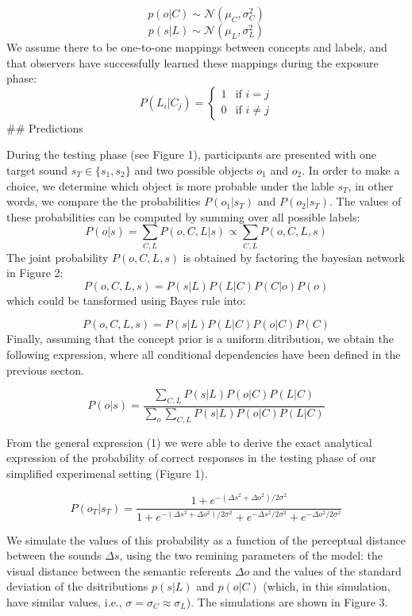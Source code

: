 \documentclass[10pt, letterpaper]{article}
\begin{document}
\[ p(o | C) \sim  \mathcal{N}(\mu_C, \sigma^2_C) \]
\[ p(s| L) \sim  \mathcal{N}(\mu_L, \sigma^2_L) \] We assume there to be
one-to-one mappings between concepts and labels, and that observers have
successfully learned these mappings during the exposure phase: \[
P(L_i|C_j) = 
\begin{cases}
  1 & \text{if  }  i=j \\  
  0  & \text{if  }  i\neq j 
\end{cases}
\] \#\# Predictions

During the testing phase (see Figure 1), participants are presented with
one target sound \(s_T \in\{s_1, s_2\}\) and two possible objects
\(o_1\) and \(o_2\). In order to make a choice, we determine which
object is more probable under the lable \(s_T\), in other words, we
compare the the probabilities \(P(o_1|s_T)\) and \(P(o_2|s_T)\). The
values of these probabilities can be computed by summing over all
possible labels:
\[P(o|s)=\sum_{C,L} P(o, C, L| s) \propto \sum_{C,L} P(o, C, L, s) \]
The joint probability \(P(o, C, L, s)\) is obtained by factoring the
bayesian network in Figure 2: \[P(o,C,L,s) = P(s|L)P(L|C)P(C|o)P(o) \]
which could be tansformed using Bayes rule into:

\[P(o,C,L,s) = P(s|L)P(L|C)P(o|C)P(C) \] Finally, assuming that the
concept prior is a uniform ditribution, we obtain the following
expression, where all conditional dependencies have been defined in the
previous secton.

\begin{equation}
P(o|s) = \frac{\sum_{C,L} P(s|L)P(o|C)P(L|C)}{\sum_{o} \sum_{C,L} P(s|L)P(o|C)P(L|C)}
\end{equation}

From the general expression (1) we were able to derive the exact
analytical expression of the probability of correct responses in the
testing phase of our simplified experimenal setting (Figure 1).

\begin{equation}
P(o_T|s_T)= \frac{1 + e^{-(\Delta s^2 + \Delta o^2) /2\sigma^2}}{1 + e^{-(\Delta s^2 + \Delta o^2) /2\sigma^2} + e^{-\Delta s^2 /2\sigma^2} + e^{-\Delta o^2 /2\sigma^2 }}
\end{equation}

We simulate the values of this probability as a function of the
perceptual distance between the sounds \(\Delta s\), using the two
remining parameters of the model: the visual distance between the
semantic referents \(\Delta o\) and the values of the standard deviation
of the dsitributions \(p(s| L)\) and \(p(o | C)\) (which, in this
simulation, have similar values, i.e.,
\(\sigma =\sigma_C \approx \sigma_L\)). The simulations are shown in
Figure 3.
\end{document}
